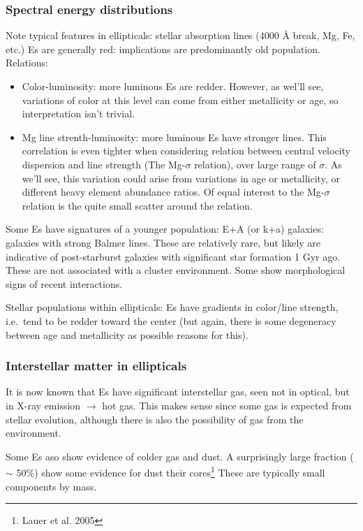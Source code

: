 \documentclass{article}
\begin{document}
\subsubsection{Spectral energy distributions}
Note typical features in ellipticals: stellar absorption lines
(4000 \AA{} break, Mg, Fe, etc.)
Es are generally red: implications are predominantly old population.
Relations:
\begin{itemize}
    \item Color-luminosity: more luminous Es are redder. However, as wel'll
        see, variations of color at this level can come from either metallicity
        or age, so interpretation isn't trivial.
    \item Mg line strenth-luminosity: more luminous Es have stronger lines.
        This correlation is even tighter when considering relation between
        central velocity dispersion and line strength (The Mg-$\sigma$ relation),
        over large range of $\sigma$. As we'll see, this variation could
        arise from variations in age or metallicity, or different heavy element
        abundance ratios. Of equal interest to the Mg-$\sigma$ relation is the
        quite small scatter around the relation.
\end{itemize}
Some Es have signatures of a younger population: E+A (or k+a) galaxies:
galaxies with strong Balmer lines. These are relatively rare, but likely
are indicative of post-starburst galaxies with significant star formation
1 Gyr ago. These are not associated with a cluster environment. Some show
morphological signs of recent interactions.

Stellar populations within ellipticals: Es have gradients in color/line
strength, i.e.\ tend to be redder toward the center (but again, there is
some degeneracy between age and metallicity as possible reasons for this).

\subsubsection{Interstellar matter in ellipticals} It is now known that Es
have significant interstellar gas, seen not in optical, but in X-ray
emission $\rightarrow$ hot gas. This makes sense since some gas is expected
from stellar evolution, although there is also the possibility of gas from
the environment.

Some Es aso show evidence of colder gas and dust. A surprisingly large
fraction ($\sim$ 50\%) show some evidence for dust their
cores\footnote{Lauer et al. 2005} These are typically small components by
mass.
\end{document}
